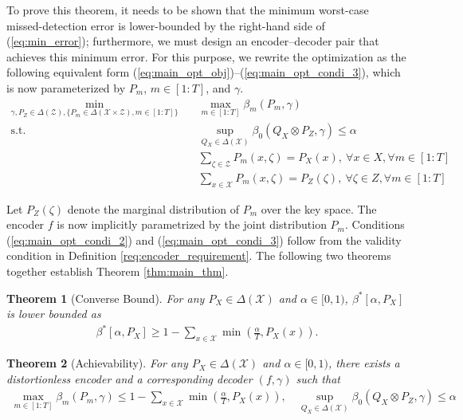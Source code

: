 \documentclass[11pt,letterpaper]{article}
\newtheorem{theorem}{\textbf{Theorem}}
\newcommand{\cX}{\mathcal{X}}
\newcommand{\cZ}{\mathcal{Z}}
\begin{document}
To prove this theorem, it needs to be shown that the minimum worst-case missed-detection error is lower-bounded by the right-hand side of (\ref{eq:min_error}); furthermore, we must design an encoder–decoder pair that achieves this minimum error. For this purpose, we rewrite the optimization as the following equivalent form (\ref{eq:main_opt_obj})–(\ref{eq:main_opt_condi_3}), which is now parameterized by $P_m$, $m\in[1:T]$, and $\gamma$.
\begin{align}
    \min_{\gamma,P_Z\in \Delta(\cZ),\{P_m\in \Delta(\cX\times\cZ),m\in[1:T]\}} \quad & \max_{m\in[1:T]} \beta_m(P_m, \gamma)\label{eq:main_opt_obj} \\
    \text{s.t.}  \quad & \sup_{Q_X\in \Delta(\cX)} \beta_0 (Q_X\otimes P_Z,\gamma) \leq \alpha \label{eq:main_opt_condi_1}\\
    & \sum_{\zeta \in \cZ} P_m(x, \zeta) = P_X(x), ~ \forall x \in X, \forall m \in [1:T] \label{eq:main_opt_condi_2}\\
    & \sum_{x \in \cX} P_m (x, \zeta) = P_{Z}(\zeta), ~ \forall \zeta \in Z, \forall m \in [1:T] \label{eq:main_opt_condi_3}
\end{align}

Let $P_{Z}(\zeta)$ denote the marginal distribution of $P_m$ over the key space. The encoder $f$ is now implicitly parametrized by the joint distribution $P_m$. Conditions (\ref{eq:main_opt_condi_2}) and (\ref{eq:main_opt_condi_3}) follow from the validity condition in Definition \ref{req:encoder_requirement}. The following two theorems together establish Theorem \ref{thm:main_thm}.

\begin{theorem} [Converse Bound]\label{thm:converse_bound}
    For any $P_X \in \Delta(\cX)$ and $\alpha \in [0,1)$, $\beta^*[\alpha, P_X]$ is lower bounded as 
    \begin{align}
        \beta^*[\alpha, P_X]\geq 1 - \sum_{x\in \cX} \min\left(\tfrac{\alpha}{T}, P_X(x)\right).
    \end{align}
\end{theorem}

\begin{theorem} [Achievability]\label{thm:forward}
     For any $P_X \in \Delta(\cX)$ and $\alpha \in [0,1)$, there exists a distortionless encoder and a corresponding decoder $(f, \gamma)$ such that 
    \begin{align}
    \max_{m\in [1:T]}\beta_m(P_m, \gamma)\leq 1- \sum_{x\in \cX} \min\left(\tfrac{\alpha}{T}, P_X(x)\right),\quad \sup_{Q_X\in\Delta(\cX)} \beta_0 (Q_X\otimes P_Z,\gamma) \leq \alpha
    \end{align}
\end{theorem}
\end{document}
